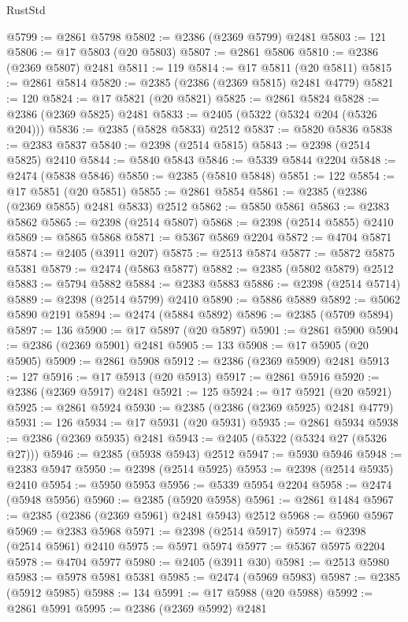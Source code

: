 \begin{lexlean}{RustStd}
\begin{coremodule}
{\begin{coremodule}
{{{{{{{{{{{{{{{{{{{{{{{{{{{{{{{{{{{{{{{{{{{{{{{{{{@5799 := @2861 @5798
@5802 := @2386 (@2369 @5799) @2481
@5803 := 121
@5806 := @17 @5803 (@20 @5803)
@5807 := @2861 @5806
@5810 := @2386 (@2369 @5807) @2481
@5811 := 119
@5814 := @17 @5811 (@20 @5811)
@5815 := @2861 @5814
@5820 := @2385 (@2386 (@2369 @5815) @2481 @4779)
@5821 := 120
@5824 := @17 @5821 (@20 @5821)
@5825 := @2861 @5824
@5828 := @2386 (@2369 @5825) @2481
@5833 := @2405 (@5322 (@5324 @204 (@5326 @204)))
@5836 := @2385 (@5828 @5833) @2512
@5837 := @5820 @5836
@5838 := @2383 @5837
@5840 := @2398 (@2514 @5815)
@5843 := @2398 (@2514 @5825) @2410
@5844 := @5840 @5843
@5846 := @5339 @5844 @2204
@5848 := @2474 (@5838 @5846)
@5850 := @2385 (@5810 @5848)
@5851 := 122
@5854 := @17 @5851 (@20 @5851)
@5855 := @2861 @5854
@5861 := @2385 (@2386 (@2369 @5855) @2481 @5833) @2512
@5862 := @5850 @5861
@5863 := @2383 @5862
@5865 := @2398 (@2514 @5807)
@5868 := @2398 (@2514 @5855) @2410
@5869 := @5865 @5868
@5871 := @5367 @5869 @2204
@5872 := @4704 @5871
@5874 := @2405 (@3911 @207)
@5875 := @2513 @5874
@5877 := @5872 @5875 @5381
@5879 := @2474 (@5863 @5877)
@5882 := @2385 (@5802 @5879) @2512
@5883 := @5794 @5882
@5884 := @2383 @5883
@5886 := @2398 (@2514 @5714)
@5889 := @2398 (@2514 @5799) @2410
@5890 := @5886 @5889
@5892 := @5062 @5890 @2191
@5894 := @2474 (@5884 @5892)
@5896 := @2385 (@5709 @5894)
@5897 := 136
@5900 := @17 @5897 (@20 @5897)
@5901 := @2861 @5900
@5904 := @2386 (@2369 @5901) @2481
@5905 := 133
@5908 := @17 @5905 (@20 @5905)
@5909 := @2861 @5908
@5912 := @2386 (@2369 @5909) @2481
@5913 := 127
@5916 := @17 @5913 (@20 @5913)
@5917 := @2861 @5916
@5920 := @2386 (@2369 @5917) @2481
@5921 := 125
@5924 := @17 @5921 (@20 @5921)
@5925 := @2861 @5924
@5930 := @2385 (@2386 (@2369 @5925) @2481 @4779)
@5931 := 126
@5934 := @17 @5931 (@20 @5931)
@5935 := @2861 @5934
@5938 := @2386 (@2369 @5935) @2481
@5943 := @2405 (@5322 (@5324 @27 (@5326 @27)))
@5946 := @2385 (@5938 @5943) @2512
@5947 := @5930 @5946
@5948 := @2383 @5947
@5950 := @2398 (@2514 @5925)
@5953 := @2398 (@2514 @5935) @2410
@5954 := @5950 @5953
@5956 := @5339 @5954 @2204
@5958 := @2474 (@5948 @5956)
@5960 := @2385 (@5920 @5958)
@5961 := @2861 @1484
@5967 := @2385 (@2386 (@2369 @5961) @2481 @5943) @2512
@5968 := @5960 @5967
@5969 := @2383 @5968
@5971 := @2398 (@2514 @5917)
@5974 := @2398 (@2514 @5961) @2410
@5975 := @5971 @5974
@5977 := @5367 @5975 @2204
@5978 := @4704 @5977
@5980 := @2405 (@3911 @30)
@5981 := @2513 @5980
@5983 := @5978 @5981 @5381
@5985 := @2474 (@5969 @5983)
@5987 := @2385 (@5912 @5985)
@5988 := 134
@5991 := @17 @5988 (@20 @5988)
@5992 := @2861 @5991
@5995 := @2386 (@2369 @5992) @2481
}}}}}}}}}}}}}}}}}}}}}}}}}}}}}}}}}}}}}}}}}}}}}}}}}}
\end{coremodule}}
\end{coremodule}
\end{lexlean}
